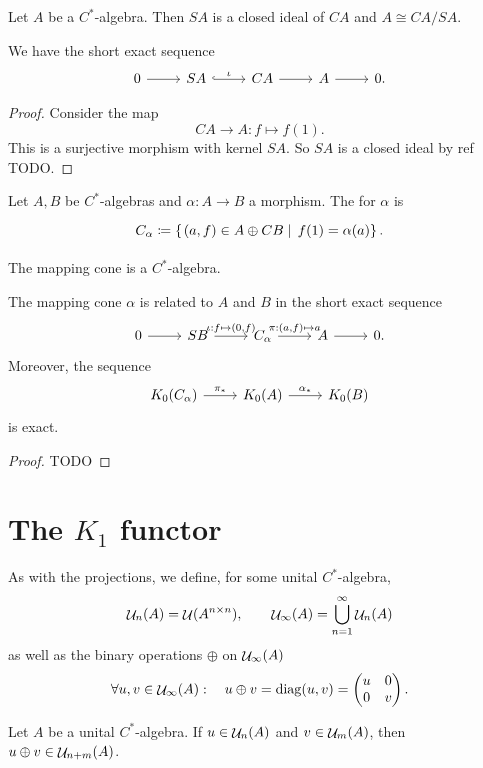 \begin{lemma} \label{lemma:exactSequenceSuspensionCone}
Let $A$ be a $C^*$-algebra. Then $SA$ is a closed ideal of $CA$ and $A \cong CA/SA$.

We have the short exact sequence
\[ \begin{tikzcd}
 0 \rar & SA \rar[hook, "\iota"] & CA \rar & A \rar & 0.
\end{tikzcd} \]
\end{lemma}
\begin{proof}
Consider the map
\[ CA \to A: f\mapsto f(1). \]
This is a surjective morphism with kernel $SA$. So $SA$ is a closed ideal by ref TODO.
\end{proof}


\begin{definition}
Let $A,B$ be $C^*$-algebras and $\alpha: A\to B$ a morphism. The  for $\alpha$ is
\[ \begin{tikzcd}
C_\alpha \defeq \setbuilder{(a, f) \in A\oplus CB}{f(1) = \alpha(a)}.
\end{tikzcd} \]
\end{definition}
The mapping cone is a $C^*$-algebra.

\begin{lemma}
The mapping cone $\alpha$ is related to $A$ and $B$ in the short exact sequence
\[ \begin{tikzcd}
0 \rar & SB \rar{\iota: f\mapsto (0,f)} & C_\alpha \rar{\pi: (a,f) \mapsto a} & A \rar & 0.
\end{tikzcd} \]
Moreover, the sequence
\[ \begin{tikzcd}
K_0(C_\alpha) \rar{\pi_*} & K_0(A) \rar{\alpha_*} & K_0(B)
\end{tikzcd} \]
is exact.
\end{lemma}
\begin{proof}
TODO
\end{proof}


\section{The $K_1$ functor}
\begin{definition}
As with the projections, we define, for some unital $C^*$-algebra,
\[ \mathop{\mathcal{U}}\nolimits_n(A) = \mathop{\mathcal{U}}\nolimits(A^{n\times n}), \qquad \mathop{\mathcal{U}}\nolimits_\infty(A) = \bigcup^\infty_{n=1}\mathop{\mathcal{U}}\nolimits_n(A) \]
as well as the binary operations $\oplus$ on $\mathop{\mathcal{U}}\nolimits_\infty(A)$
\[ \forall u,v \in \mathop{\mathcal{U}}\nolimits_\infty(A): \quad u\oplus v = \operatorname{diag}(u,v) = \begin{pmatrix}
u & 0 \\ 0 & v
\end{pmatrix}. \]
\end{definition}
\begin{lemma}
Let $A$ be a unital $C^*$-algebra. If $u\in\mathop{\mathcal{U}}\nolimits_n(A)$ and $v\in\mathop{\mathcal{U}}\nolimits_m(A)$, then $u\oplus v\in\mathop{\mathcal{U}}\nolimits_{n+m}(A)$.
\end{lemma}
